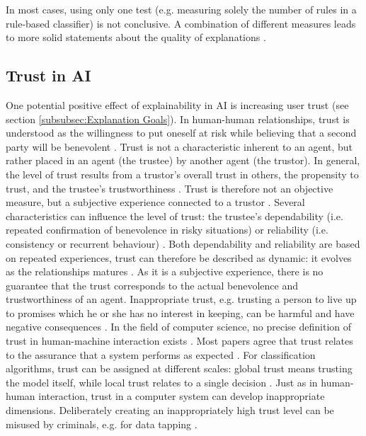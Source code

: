 In most cases, using only one test (e.g. measuring solely the number of rules in a rule-based classifier) is not conclusive. A combination of different measures leads to more solid statements about the quality of explanations \cite{richardson2018survey}.





\subsection{Trust in AI}
One potential positive effect of explainability in AI is increasing user trust (see section \ref{subsubsec:Explanation Goals}). In human-human relationships, trust is understood as the willingness to put oneself at risk while believing that a second party will be benevolent \cite{rempel1985trust}. Trust is not a characteristic inherent to an agent, but rather placed in an agent (the trustee) by another agent (the trustor). In general, the level of trust results from a trustor's overall trust in others, the propensity to trust, and the trustee's trustworthiness \cite{mayer1995integrative}. Trust is therefore not an objective measure, but a subjective experience connected to a trustor \cite{bedi2006assessing, mohammadi2013trustworthiness}. Several characteristics can influence the level of trust: the trustee's dependability (i.e. repeated confirmation of benevolence in risky situations) or reliability (i.e. consistency or recurrent behaviour) \cite{rempel1985trust}. Both dependability and reliability are based on repeated experiences, trust can therefore be described as dynamic: it evolves as the relationships matures \cite{rempel1985trust}. As it is a subjective experience, there is no guarantee that the trust corresponds to the actual benevolence and trustworthiness of an agent. Inappropriate trust, e.g. trusting a person to live up to promises which he or she has no interest in keeping, can be harmful and have negative consequences \cite{van2001perceived}.\newline
In the field of computer science, no precise definition of trust in human-machine interaction exists \cite{artz2007survey}. Most papers agree that trust relates to the assurance that a system performs as expected \cite{mohammadi2013trustworthiness}. For classification algorithms, trust can be assigned at different scales: global trust means trusting the model itself, while local trust relates to a single decision \cite{ribeiro2016should}. Just as in human-human interaction, trust in a computer system can develop inappropriate dimensions. Deliberately creating an inappropriately high trust level can be misused by criminals, e.g. for data tapping \cite{mohammadi2013trustworthiness}.\newline


